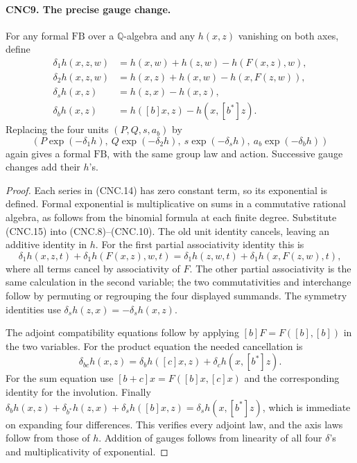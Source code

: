 \paragraph{CNC9. The precise gauge change.}
\label{claim:CNC9}
For any formal \(\mathrm{FB}\) over a \(\mathbb Q\)-algebra
and any \(h(x,z)\) vanishing on both axes, define
\[
\begin{aligned}
 \delta_1h(x,z,w)&=h(x,w)+h(z,w)-h(F(x,z),w),\\
 \delta_2h(x,z,w)&=h(x,z)+h(x,w)-h(x,F(z,w)),\\
 \delta_sh(x,z)&=h(z,x)-h(x,z),\\
 \delta_bh(x,z)&=h([b]x,z)-h(x,[b^*]z).
\end{aligned}                                                   \tag{CNC.14}
\]
Replacing the four units \((P,Q,s,a_b)\) by
\[
 (P\exp(-\delta_1h),\ Q\exp(-\delta_2h),\
       s\exp(-\delta_sh),\ a_b\exp(-\delta_bh))               \tag{CNC.15}
\]
again gives a formal \(\mathrm{FB}\), with the same group law and
action.  Successive gauge changes add their \(h\)'s.
\begin{proof}
Each series in (CNC.14) has zero constant term, so its exponential is
defined.  Formal exponential is multiplicative on sums in a commutative
rational algebra, as follows from the binomial formula at each finite
degree.  Substitute (CNC.15) into (CNC.8)--(CNC.10).  The old unit
identity cancels, leaving an additive identity in \(h\).
For the first partial associativity identity this is
\[
 \delta_1h(x,z,t)+\delta_1h(F(x,z),w,t)
 =\delta_1h(z,w,t)+\delta_1h(x,F(z,w),t),
\]
where all terms cancel by associativity of \(F\).  The other
partial associativity is the same calculation in the second variable;
the two commutativities and interchange follow by permuting or
regrouping the four displayed summands.  The symmetry identities use
\(\delta_sh(z,x)=-\delta_sh(x,z)\).

The adjoint compatibility equations follow by applying
\([b]F=F([b],[b])\) in the two variables.  For the product equation
the needed cancellation is
\[
 \delta_{bc}h(x,z)=\delta_bh([c]x,z)
                         +\delta_ch(x,[b^*]z).
\]
For the sum equation use
\([b+c]x=F([b]x,[c]x)\) and the corresponding identity for the
involution.  Finally
\(\delta_bh(x,z)+\delta_{b^*}h(z,x)+\delta_sh([b]x,z)
=\delta_sh(x,[b^*]z)\), which is immediate on expanding four
differences.  This verifies every adjoint law, and the axis laws follow
from those of \(h\).  Addition of gauges follows from linearity of
all four \(\delta\)'s and multiplicativity of exponential.
\end{proof}

